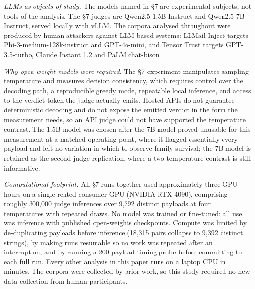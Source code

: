 \documentclass[conference]{IEEEtran}
\begin{document}
\textit{LLMs as objects of study.} The models named in \S7 are experimental subjects, not tools of the analysis. The \S7 judges are Qwen2.5-1.5B-Instruct and Qwen2.5-7B-Instruct, served locally with vLLM. The corpora analysed throughout were produced by human attackers against LLM-based systems: LLMail-Inject targets Phi-3-medium-128k-instruct and GPT-4o-mini, and Tensor Trust targets GPT-3.5-turbo, Claude Instant 1.2 and PaLM chat-bison.

\textit{Why open-weight models were required.} The \S7 experiment manipulates sampling temperature and measures decision consistency, which requires control over the decoding path, a reproducible greedy mode, repeatable local inference, and access to the verdict token the judge actually emits. Hosted APIs do not guarantee deterministic decoding and do not expose the emitted verdict in the form the measurement needs, so an API judge could not have supported the temperature contrast. The 1.5B model was chosen after the 7B model proved unusable for this measurement at a matched operating point, where it flagged essentially every payload and left no variation in which to observe family survival; the 7B model is retained as the second-judge replication, where a two-temperature contrast is still informative.

\textit{Computational footprint.} All \S7 runs together used approximately three GPU-hours on a single rented consumer GPU (NVIDIA RTX 4090), comprising roughly 300,000 judge inferences over 9,392 distinct payloads at four temperatures with repeated draws. No model was trained or fine-tuned; all use was inference with published open-weights checkpoints. Compute was limited by de-duplicating payloads before inference (18,315 pairs collapse to 9,392 distinct strings), by making runs resumable so no work was repeated after an interruption, and by running a 200-payload timing probe before committing to each full run. Every other analysis in this paper runs on a laptop CPU in minutes. The corpora were collected by prior work, so this study required no new data collection from human participants.



\end{document}
